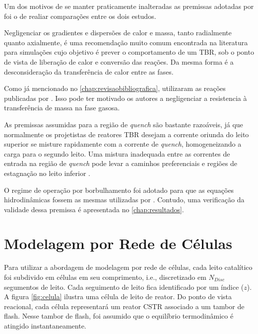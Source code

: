 Um dos motivos de se manter praticamente inalteradas as premissas adotadas por
 foi o de realiar comparações entre os dois estudos.

Negligenciar os gradientes e dispersões de calor e massa, tanto radialmente
quanto axialmente, é uma recomendação muito comum encontrada na literatura
\cite{Ancheyta2011, Ranade2011, Froment2011} para simulações cujo objetivo é
prever o comportamento de um TBR, sob o ponto de vista de liberação de calor e
conversão das reações. Da mesma forma é a desconsideração da transferência de
calor entre as fases.

Como já mencionado no \autoref{chap:revisaobibliografica},
 utilizaram as reações publicadas por
. Isso pode ter motivado os autores a negligenciar a
resistencia à transferência de massa na fase gasosa.

As premissas assumidas para a região de \emph{quench} são bastante razoáveis, já
que normalmente os projetistas de reatores TBR desejam a corrente oriunda do
leito superior se misture rapidamente com a corrente de \emph{quench},
homogeneizando a carga para o segundo leito. Uma mistura inadequada entre as
correntes de entrada na região de \emph{quench} pode levar a caminhos
preferenciais e regiões de estagnação no leito inferior \cite{Ancheyta2011}.

O regime de operação por borbulhamento foi adotado para que as
equações hidrodinâmicas fossem as mesmas utilizadas por .
Contudo, uma verificação da validade dessa premissa é apresentada no
\autoref{chap:resultados}.

\section{Modelagem por Rede de Células} \label{sec:modelagemredecelulas}

Para utilizar a abordagem de modelagem por rede de células, cada leito
catalítico foi subdivido em células em seu comprimento, i.e., discretizado em
$N_{Disc}$ segumentos de leito. Cada seguimento de leito fica identificado por
um índice ($z$). A figura \autoref{fig:celula} ilustra uma célula de leito de
reator. Do ponto de vista reacional, cada célula representará um reator CSTR
associado a um tambor de flash. Nesse tambor de flash, foi assumido que o
equilíbrio termodinâmico é atingido instantaneamente.

